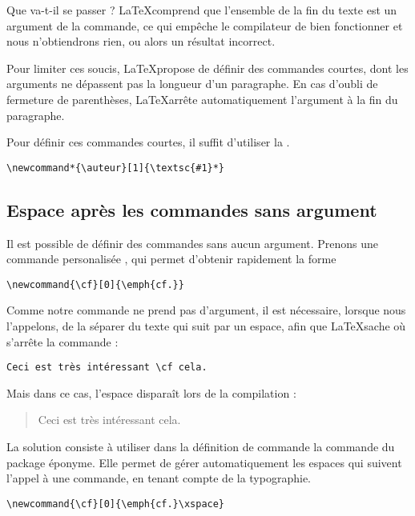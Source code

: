 Que va-t-il se passer ? \LaTeX comprend que l'ensemble de la fin du texte est un argument de la commande, ce qui empêche le compilateur de bien fonctionner  et nous n'obtiendrons rien, ou alors un résultat incorrect.

Pour limiter ces soucis, \LaTeX propose de définir des commandes courtes, dont les arguments ne dépassent pas la longueur d'un paragraphe. En cas d'oubli de fermeture de parenthèses, \LaTeX arrête automatiquement l'argument à la fin du paragraphe.

Pour définir ces commandes courtes, il suffit d'utiliser la .

\begin{verbatim}
\newcommand*{\auteur}[1]{\textsc{#1}*}
\end{verbatim}

\subsection{Espace après les commandes sans argument}


Il est possible de définir des commandes sans aucun argument. Prenons une commande personalisée , qui permet d'obtenir rapidement la forme \forme{\cf}

\begin{verbatim}
\newcommand{\cf}[0]{\emph{cf.}}
\end{verbatim}

Comme notre commande ne prend pas d'argument, il est nécessaire, lorsque nous l'appelons, de la séparer du texte qui suit par un espace, afin que \LaTeX sache où s'arrête la commande : 

\begin{verbatim}
Ceci est très intéressant \cf cela.
\end{verbatim}

Mais dans ce cas, l'espace disparaît lors de la compilation :

\begin{quotation}
Ceci est très intéressant \cf cela.
\end{quotation}

La solution consiste à utiliser dans la définition de commande la commande  du package éponyme. Elle permet de gérer automatiquement les espaces qui suivent l'appel à une commande, en tenant compte de la typographie.

\begin{verbatim}
\newcommand{\cf}[0]{\emph{cf.}\xspace}
\end{verbatim}

